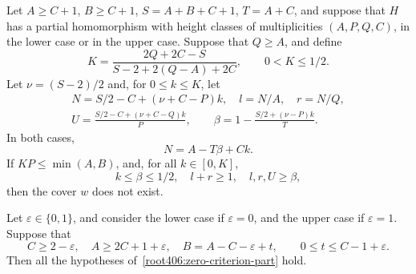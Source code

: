 \begin{lemma}
\label{zeroregions:criterion}
\label{topzero:criterion}
\label{zeroregions:wedge-algebra}
\label{topzero:wedge}
\begin{props}
\item\label{root406:zero-criterion-part}
Let $A\ge C+1$, $B\ge C+1$, $S=A+B+C+1$, $T=A+C$,
and suppose that $H$ has a partial homomorphism with height classes of multiplicities $(A,P,Q,C)$, in the lower case or in the upper case.
Suppose that $Q\ge A$, and define
\begin{equation}\label{zeroregions:K}
 K=\frac{2Q+2C-S}{S-2+2(Q-A)+2C},\qquad0<K\le1/2.
\end{equation}
Let $\nu=(S-2)/2$ and, for $0\le k\le K$, let
\begin{gather*}
 N=S/2-C+(\nu+C-P)k,\quad l=N/A,\quad r=N/Q,\\
 U=\frac{S/2-C+(\nu+C-Q)k}{P},\qquad
 \beta=1-\frac{S/2+(\nu-P)k}{T}.
\end{gather*}
In both cases,
\begin{equation}\label{zeroregions:N-identity}
 N=A-T\beta+Ck.
\end{equation}
If $KP\le\min(A,B)$, and, for all $k\in[0,K]$,
\[
 k\le\beta\le1/2,\quad l+r\ge1,\quad
 l,r,U\ge\beta,
\]
then the cover $w$ does not exist.

\item\label{root406:zero-range-part}
Let $\varepsilon\in\{0,1\}$, and consider the lower case if
$\varepsilon=0$, and the upper case if $\varepsilon=1$.
Suppose that
\[
 C\ge2-\varepsilon,\quad A\ge2C+1+\varepsilon,
 \quad B=A-C-\varepsilon+t,\qquad0\le t\le C-1+\varepsilon.
\]
Then all the hypotheses of~\ref{root406:zero-criterion-part} hold.
\end{props}
\end{lemma}
